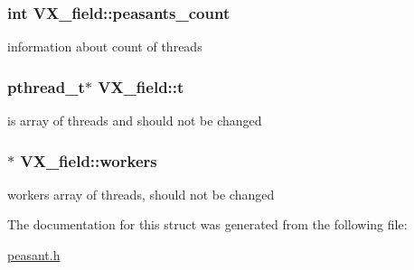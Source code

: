 \hypertarget{structVX__field_aabbf8f87f0599a512d81954691d10a1e}{
\subsubsection[{peasants\-\_\-count}]{\setlength{\rightskip}{0pt plus 5cm}int V\-X\-\_\-field\-::peasants\-\_\-count}}\label{structVX__field_aabbf8f87f0599a512d81954691d10a1e}
information about count of threads \hypertarget{structVX__field_a50a4a8795f8bc85dae98a3ef413f493a}{
\subsubsection[{t}]{\setlength{\rightskip}{0pt plus 5cm}pthread\-\_\-t$\ast$ V\-X\-\_\-field\-::t}}\label{structVX__field_a50a4a8795f8bc85dae98a3ef413f493a}
is array of threads and should not be changed \hypertarget{structVX__field_a9d3d1235edb09fba04688449f8a880c0}{
\subsubsection[{workers}]{$\ast$ V\-X\-\_\-field\-::workers}}\label{structVX__field_a9d3d1235edb09fba04688449f8a880c0}
workers array of threads, should not be changed 

The documentation for this struct was generated from the following file\-:\begin{DoxyCompactItemize}
\item 
\hyperlink{peasant_8h}{peasant.\-h}\end{DoxyCompactItemize}
